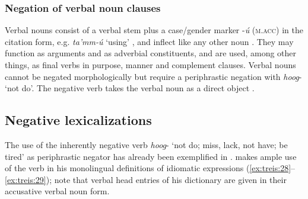 \documentclass[output=paper,colorlinks,citecolor=brown,draftmode
]{langscibook}
\begin{document}
\subsubsection{Negation of verbal noun clauses}\label{sec:treis:2.4.4}

Verbal nouns consist of a verbal stem plus a case/gender marker -\textit{ú} (\textsc{m.acc}) in the citation form, e.g. \textit{ta'mm-ú} ‘using' , and inflect like any other noun \citep{Treis2012a}. They may function as arguments and as adverbial constituents, and are used, among other things, as final verbs in purpose, manner and complement clauses. Verbal nouns cannot be  negated morphologically but require a periphrastic negation with \textit{hoog}- ‘not do’. The negative verb takes the verbal noun as a direct object .


\subsection{Negative lexicalizations}\label{sec:treis:2.5}

The use of the inherently negative verb \textit{hoog}- ‘not do; miss, lack, not have; be tired’ as periphrastic negator has already been exemplified in . \citet{AlemuForthcoming} makes ample use of the verb in his monolingual definitions of idiomatic expressions (\ref{ex:treis:28}--\ref{ex:treis:29}); note that verbal head entries of his dictionary are given in their accusative verbal noun form.

\end{document}
